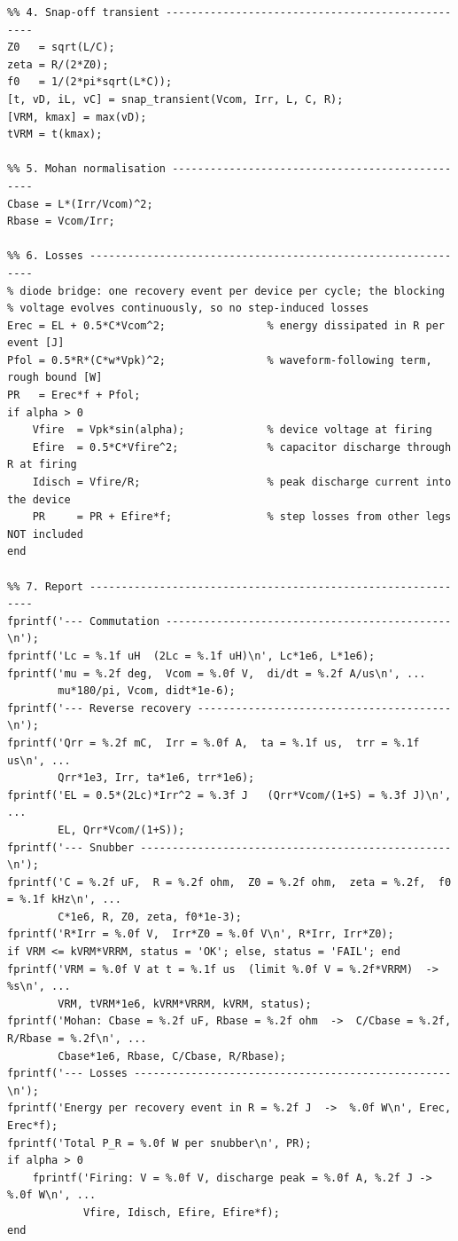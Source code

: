 \documentclass[11pt,a4paper]{article}
\begin{document}
\begin{lstlisting}
%% 4. Snap-off transient -------------------------------------------------
Z0   = sqrt(L/C);
zeta = R/(2*Z0);
f0   = 1/(2*pi*sqrt(L*C));
[t, vD, iL, vC] = snap_transient(Vcom, Irr, L, C, R);
[VRM, kmax] = max(vD);
tVRM = t(kmax);

%% 5. Mohan normalisation ------------------------------------------------
Cbase = L*(Irr/Vcom)^2;
Rbase = Vcom/Irr;

%% 6. Losses -------------------------------------------------------------
% diode bridge: one recovery event per device per cycle; the blocking
% voltage evolves continuously, so no step-induced losses
Erec = EL + 0.5*C*Vcom^2;                % energy dissipated in R per event [J]
Pfol = 0.5*R*(C*w*Vpk)^2;                % waveform-following term, rough bound [W]
PR   = Erec*f + Pfol;
if alpha > 0
    Vfire  = Vpk*sin(alpha);             % device voltage at firing
    Efire  = 0.5*C*Vfire^2;              % capacitor discharge through R at firing
    Idisch = Vfire/R;                    % peak discharge current into the device
    PR     = PR + Efire*f;               % step losses from other legs NOT included
end

%% 7. Report -------------------------------------------------------------
fprintf('--- Commutation ---------------------------------------------\n');
fprintf('Lc = %.1f uH  (2Lc = %.1f uH)\n', Lc*1e6, L*1e6);
fprintf('mu = %.2f deg,  Vcom = %.0f V,  di/dt = %.2f A/us\n', ...
        mu*180/pi, Vcom, didt*1e-6);
fprintf('--- Reverse recovery ----------------------------------------\n');
fprintf('Qrr = %.2f mC,  Irr = %.0f A,  ta = %.1f us,  trr = %.1f us\n', ...
        Qrr*1e3, Irr, ta*1e6, trr*1e6);
fprintf('EL = 0.5*(2Lc)*Irr^2 = %.3f J   (Qrr*Vcom/(1+S) = %.3f J)\n', ...
        EL, Qrr*Vcom/(1+S));
fprintf('--- Snubber -------------------------------------------------\n');
fprintf('C = %.2f uF,  R = %.2f ohm,  Z0 = %.2f ohm,  zeta = %.2f,  f0 = %.1f kHz\n', ...
        C*1e6, R, Z0, zeta, f0*1e-3);
fprintf('R*Irr = %.0f V,  Irr*Z0 = %.0f V\n', R*Irr, Irr*Z0);
if VRM <= kVRM*VRRM, status = 'OK'; else, status = 'FAIL'; end
fprintf('VRM = %.0f V at t = %.1f us  (limit %.0f V = %.2f*VRRM)  -> %s\n', ...
        VRM, tVRM*1e6, kVRM*VRRM, kVRM, status);
fprintf('Mohan: Cbase = %.2f uF, Rbase = %.2f ohm  ->  C/Cbase = %.2f, R/Rbase = %.2f\n', ...
        Cbase*1e6, Rbase, C/Cbase, R/Rbase);
fprintf('--- Losses --------------------------------------------------\n');
fprintf('Energy per recovery event in R = %.2f J  ->  %.0f W\n', Erec, Erec*f);
fprintf('Total P_R = %.0f W per snubber\n', PR);
if alpha > 0
    fprintf('Firing: V = %.0f V, discharge peak = %.0f A, %.2f J -> %.0f W\n', ...
            Vfire, Idisch, Efire, Efire*f);
end


\end{lstlisting}
\end{document}
